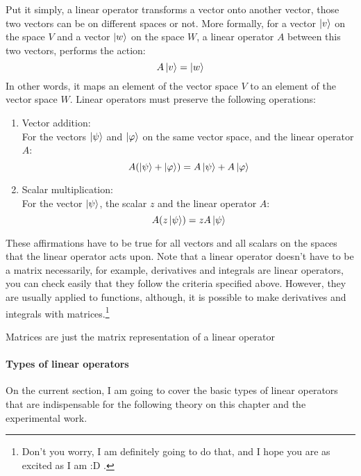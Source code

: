 Put it simply, a linear operator transforms a vector onto another vector, those two vectors can be on different spaces or not. More formally, for a vector $\ket{v}$ on the space $V$ and a vector $\ket{w}$ on the space $W$, a linear operator $A$ between this two vectors, performs the action:
$$
A \ket{v} = \ket{w}
$$
In other words, it maps an element of the vector space $V$ to an element of the vector space $W$. Linear operators must preserve the following operations:
\begin{enumerate}
	\item Vector addition: \\
	For the vectors $\ket{\psi}$ and $\ket{\varphi}$ on the same vector space, and the linear operator $A$:
	$$ A(\ket{\psi} + \ket{\varphi}) = A\ket{\psi} + A\ket{\varphi}$$ 
	\item Scalar multiplication:\\
	For the vector $\ket{\psi}$, the scalar $z$ and the linear operator $A$:
	$$ A(z\ket{\psi}) = z A \ket{\psi}$$
\end{enumerate}

These affirmations have to be true for all vectors and all scalars on the spaces that the linear operator acts upon. Note that a linear operator doesn't have to be a matrix necessarily, for example, derivatives and integrals are linear operators, you can check easily that they follow the criteria specified above. However, they are usually applied to functions, although, it is possible to make derivatives and integrals with matrices.\footnote{Don't you worry, I am definitely going to do that, and I hope you are as excited as I am :D .}

Matrices are just the matrix representation of a linear operator 

\paragraph{Types of linear operators}
On the current section, I am going to cover the basic types of linear operators that are indispensable for the following theory on this chapter and the experimental work.

